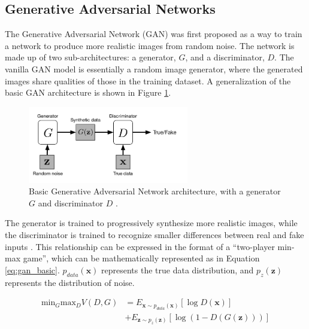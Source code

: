 \documentclass[letterpaper]{article} %
\begin{document}
\subsection{Generative Adversarial Networks}
The Generative Adversarial Network (GAN)
was first proposed as a way to train a network to produce more realistic images
from random noise. The network is made up of two sub-architectures:
a generator, $G$, and a discriminator, $D$. The vanilla GAN model is 
essentially a random image generator, where the generated images share 
qualities of those in the training dataset. A generalization of the basic GAN 
architecture is shown in Figure \ref{fig:gan}.

\begin{figure}[htbp]
	\centerline{\includegraphics[width=7cm]{gan.png}}
	\caption{Basic Generative Adversarial Network architecture, with a 
		generator $G$
		and discriminator $D$
		\cite{cgan}.}
	\label{fig:gan}
\end{figure}

The generator is trained to progressively synthesize more realistic images,
while the discriminator is trained to recognize smaller differences between 
real and fake inputs \cite{cgan}. This relationship can be expressed in the 
format of a ``two-player min-max game'', which can be mathematically 
represented as in Equation \ref{eq:gan_basic}.
$p_{data}(\mathbf{x})$ represents the true data distribution,
and $p_{z}(\mathbf{z})$ represents the distribution of noise.

\begin{equation}
\label{eq:gan_basic}
\begin{split}
\text{min}_G\text{max}_DV(D,G) &=
E_{\mathbf{x}\sim p_{data}(\mathbf{x})}[\log D(\mathbf{x})] \\
&+ E_{\mathbf{z}\sim p_{z}(\mathbf{z})}[\log(1 - D(G(\mathbf{z})))]
\end{split}
\end{equation}
\end{document}
